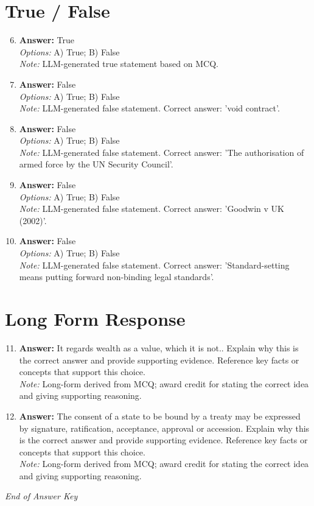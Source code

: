 \documentclass[12pt]{article}
\begin{document}
\section*{True / False}
\begin{enumerate}[label=\arabic*.]
\setcounter{enumi}{5}
\item \textbf{Answer:} True
\\ \textit{Options:} A) True; B) False
\\ \textit{Note:} LLM-generated true statement based on MCQ.
\item \textbf{Answer:} False
\\ \textit{Options:} A) True; B) False
\\ \textit{Note:} LLM-generated false statement. Correct answer: 'void contract'.
\item \textbf{Answer:} False
\\ \textit{Options:} A) True; B) False
\\ \textit{Note:} LLM-generated false statement. Correct answer: 'The authorisation of armed force by the UN Security Council'.
\item \textbf{Answer:} False
\\ \textit{Options:} A) True; B) False
\\ \textit{Note:} LLM-generated false statement. Correct answer: 'Goodwin v UK (2002)'.
\item \textbf{Answer:} False
\\ \textit{Options:} A) True; B) False
\\ \textit{Note:} LLM-generated false statement. Correct answer: 'Standard-setting means putting forward non-binding legal standards'.
\end{enumerate}

\section*{Long Form Response}
\begin{enumerate}[label=\arabic*.]
\setcounter{enumi}{10}
\item \textbf{Answer:} It regards wealth as a value, which it is not.. Explain why this is the correct answer and provide supporting evidence. Reference key facts or concepts that support this choice.
\\ \textit{Note:} Long-form derived from MCQ; award credit for stating the correct idea and giving supporting reasoning.
\item \textbf{Answer:} The consent of a state to be bound by a treaty may be expressed by signature, ratification, acceptance, approval or accession. Explain why this is the correct answer and provide supporting evidence. Reference key facts or concepts that support this choice.
\\ \textit{Note:} Long-form derived from MCQ; award credit for stating the correct idea and giving supporting reasoning.
\end{enumerate}

\vfill
\noindent\textit{End of Answer Key}
\end{document}
